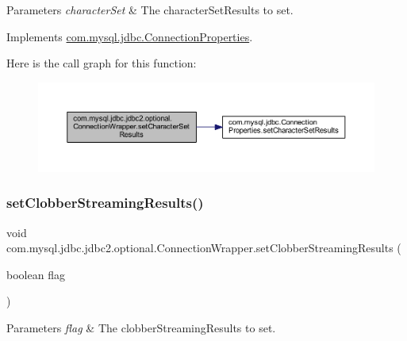 \begin{DoxyParams}{Parameters}
{\em character\+Set} & The character\+Set\+Results to set. \\
\hline
\end{DoxyParams}


Implements \mbox{\hyperlink{interfacecom_1_1mysql_1_1jdbc_1_1_connection_properties_a8279ffd124fca779625e5d1d94f32c56}{com.\+mysql.\+jdbc.\+Connection\+Properties}}.

Here is the call graph for this function\+:
\nopagebreak
\begin{figure}[H]
\begin{center}
\leavevmode
\includegraphics[width=350pt]{classcom_1_1mysql_1_1jdbc_1_1jdbc2_1_1optional_1_1_connection_wrapper_a34e64b74d02a705c8a2e5e9d9c3f7503_cgraph}
\end{center}
\end{figure}
\mbox{\label{classcom_1_1mysql_1_1jdbc_1_1jdbc2_1_1optional_1_1_connection_wrapper_a89ce1b22b67b5682dd976a11ccae9a3d}} 
\subsubsection{\texorpdfstring{set\+Clobber\+Streaming\+Results()}{setClobberStreamingResults()}}
{\footnotesize\ttfamily void com.\+mysql.\+jdbc.\+jdbc2.\+optional.\+Connection\+Wrapper.\+set\+Clobber\+Streaming\+Results (\begin{DoxyParamCaption}\item[{boolean}]{flag }\end{DoxyParamCaption})}


\begin{DoxyParams}{Parameters}
{\em flag} & The clobber\+Streaming\+Results to set. \\
\hline
\end{DoxyParams}


